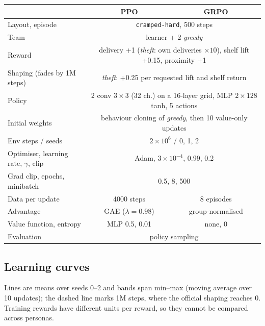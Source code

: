 \documentclass[letterpaper]{article} %
\begin{document}
\noindent\begin{minipage}{\textwidth}
\centering
\footnotesize
\setlength{\tabcolsep}{4pt}
\begin{tabular}{@{}lcc@{}}
\toprule
 & PPO & GRPO \\
\midrule
Layout, episode & \multicolumn{2}{c}{\texttt{cramped-hard}, 500 steps} \\
Team & \multicolumn{2}{c}{learner + 2 \emph{greedy}} \\
Reward & \multicolumn{2}{c}{delivery +1 (\emph{theft}: own deliveries $\times10$), shelf lift +0.15, proximity +1} \\
Shaping (fades by 1M steps) & \multicolumn{2}{c}{\emph{theft}: +0.25 per requested lift and shelf return} \\
Policy & \multicolumn{2}{c}{2 conv $3\times3$ (32 ch.) on a 16-layer grid, MLP $2\times128$ tanh, 5 actions} \\
Initial weights & \multicolumn{2}{c}{behaviour cloning of \emph{greedy}, then 10 value-only updates} \\
Env steps / seeds & \multicolumn{2}{c}{$2\times10^6$ / 0, 1, 2} \\
Optimiser, learning rate, $\gamma$, clip & \multicolumn{2}{c}{Adam, $3\times10^{-4}$, 0.99, 0.2} \\
Grad clip, epochs, minibatch & \multicolumn{2}{c}{0.5, 8, 500} \\
Data per update & 4000 steps & 8 episodes \\
Advantage & GAE ($\lambda=0.98$) & group-normalised \\
Value function, entropy & MLP 0.5, 0.01 & none, 0 \\
Evaluation & \multicolumn{2}{c}{policy sampling} \\
\bottomrule
\end{tabular}
\label{tab:hparams_rware}
\end{minipage}\par\medskip

\subsection{Learning curves}
\label{app:curves}
Lines are means over seeds 0--2 and bands span min--max (moving average over 10 updates); the dashed line marks 1M
steps, where the official shaping reaches 0. Training rewards have different units per reward, so they cannot be
compared across personas.
\end{document}
